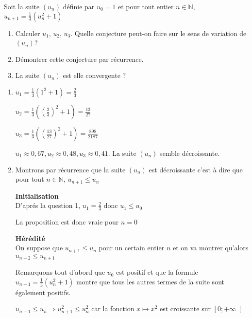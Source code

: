 
%
Soit la suite $\left(u_{n}\right)$ définie par $u_{0}=1$ et pour tout entier $n \in  \mathbb{N}$, $u_{n+1}=\frac{1}{3}\left(u_{n}^{2}+1\right)$
\begin{enumerate}
     \item
     Calculer $u_{1}$, $u_{2}$, $u_{3}$. Quelle conjecture peut-on faire sur le sens de variation de $\left(u_{n}\right)$?
     \item
     Démontrer cette conjecture par récurrence.
     \item
     La suite $\left(u_{n}\right)$ est elle convergente ?
\end{enumerate}
\begin{corrige}
     \begin{enumerate}
          \item
          $u_{1}=\frac{1}{3}\left(1^{2}+1\right)=\frac{2}{3}$
          \par
          $u_{2}=\frac{1}{3}\left(\left(\frac{2}{3}\right)^{2}+1\right)=\frac{13}{27}$
          \par
          $u_{3}=\frac{1}{3}\left(\left(\frac{13}{27}\right)^{2}+1\right)=\frac{898}{2187}$
          \par
          $u_{1}\approx 0,67,  u_{2}\approx 0,48,  u_{3}\approx 0,41$. La suite $\left(u_{n}\right)$ semble décroissante.
          \item
          Montrons par récurrence que la suite $\left(u_{n}\right)$ est décroissante c'est à dire que pour tout $n \in  \mathbb{N}$, $u_{n+1}\leqslant u_{n}$
\par
          \textbf{Initialisation}
\\
          D'aprés la question 1, $u_{1}=\frac{2}{3}$ donc $u_{1}\leqslant u_{0}$
          \par
          La proposition est donc vraie pour $n=0$
\par
          \textbf{Hérédité}
\\
          On suppose que $u_{n+1}\leqslant u_{n}$ pour un certain entier $n$ et on va montrer qu'alors $u_{n+2} \leqslant  u_{n+1}$
          \par
          Remarquons tout d'abord que $u_{0}$ est positif et que la formule $u_{n+1}=\frac{1}{3}\left(u_{n}^{2}+1\right)$ montre que tous les autres termes de la suite sont également positifs.
          \par
          $u_{n+1} \leqslant  u_{n} \Rightarrow  u_{n+1}^{2} \leqslant  u_{n}^{2} $ car la fonction $x\mapsto x^{2}$ est croissante sur $\left[0;+\infty \right[$

\end{enumerate}
\end{corrige}
